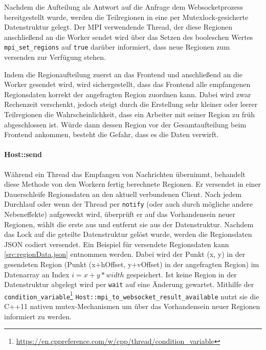 Nachdem die Aufteilung als Antwort auf die Anfrage dem Websocketprozess bereitgestellt wurde, werden die Teilregionen in eine per Mutexlock-gesicherte Datenstruktur
gelegt. Der MPI verwendende Thread, der diese Regionen anschließend an die Worker sendet wird über das Setzen des booleschen Wertes \verb|mpi_set_regions|
auf \verb|true| darüber informiert, dass neue Regionen zum versenden zur Verfügung stehen.

Indem die Regionaufteilung zuerst an das Frontend und anschließend an die Worker gesendet wird,
wird sichergestellt, dass das Frontend alle empfangenen Regionsdaten korrekt der angefragten Region zuordnen kann.
Dabei wird zwar Rechenzeit verschenkt, jedoch steigt durch die Erstellung sehr kleiner oder leerer Teilregionen
die Wahrscheinlichkeit, dass ein Arbeiter mit seiner Region zu früh abgeschlossen ist.
Würde dann dessen Region vor der Gesamtaufteilung beim Frontend ankommen, besteht die Gefahr,
dass es die Daten verwirft.

\begin{figure}
	
\end{figure}

\begin{figure}
	
\end{figure}

\paragraph{Host::send}\label{cls:Host::send}

Während ein Thread das Empfangen von Nachrichten übernimmt, behandelt diese Methode von den Workern fertig berechnete Regionen.
Er versendet in einer Dauerschleife Regionsdaten an den aktuell verbundenen Client.
Nach jedem Durchlauf oder wenn der Thread per \verb|notify| (oder auch durch mögliche andere Nebeneffekte) aufgeweckt wird,
überprüft er auf das Vorhandensein neuer Regionen, wählt die erste aus und entfernt sie aus der Datenstruktur.
Nachdem das Lock auf die geteilte Datenstruktur gelöst wurde, werden die Regionsdaten JSON codiert versendet.
Ein Beispiel für versendete Regionsdaten kann \autoref{src:regionData.json} entnommen werden.
Dabei wird der Punkt (x, y) in der gesendeten Region (Punkt (x+hOffset, y+vOffset) in der angefragten Region)
im Datenarray an Index $i = x + y * width$ gespeichert.
Ist keine Region in der Datenstruktur abgelegt wird per \verb|wait| auf eine Änderung gewartet.
Mithilfe der \verb|condition_variable|\footnote{\url{https://en.cppreference.com/w/cpp/thread/condition_variable}} \verb|Host::mpi_to_websocket_result_available|
nutzt sie die C++11 nativen mutex-Mechanismen um über das Vorhandensein neuer Regionen informiert zu werden.

